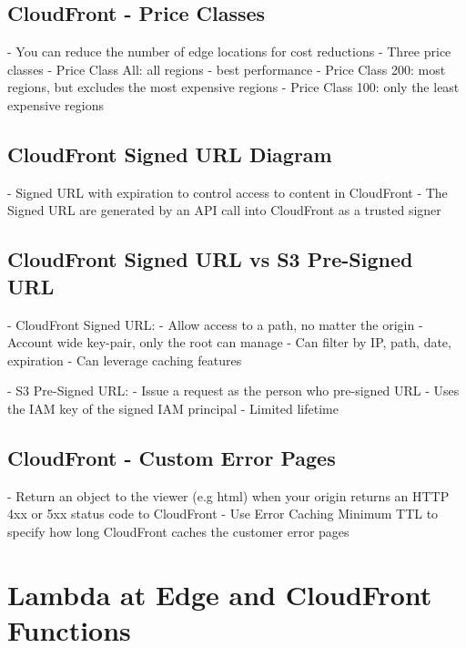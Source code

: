 \documentclass[11pt]{book}
\begin{document}
    \subsection{CloudFront - Price Classes}
    - You can reduce the number of edge locations for cost reductions
    - Three price classes
    - Price Class All: all regions - best performance
    - Price Class 200: most regions, but excludes the most expensive regions
    - Price Class 100: only the least expensive regions


    \subsection{CloudFront Signed URL Diagram}
    - Signed URL with expiration to control access to content in CloudFront
    - The Signed URL are generated by an API call into CloudFront as a trusted signer

    \subsection{CloudFront Signed URL vs S3 Pre-Signed URL}
    - CloudFront Signed URL:
    - Allow access to a path, no matter the origin
    - Account wide key-pair, only the root can manage
    - Can filter by IP, path, date, expiration
    - Can leverage caching features

    - S3 Pre-Signed URL:
    - Issue a request as the person who pre-signed URL
    - Uses the IAM key of the signed IAM principal
    - Limited lifetime


    \subsection{CloudFront - Custom Error Pages}
    - Return an object to the viewer (e.g html) when your origin returns an HTTP 4xx or 5xx status code to CloudFront
    - Use Error Caching Minimum TTL to specify how long CloudFront caches the customer error pages


    \section{Lambda at Edge and CloudFront Functions}
\end{document}

